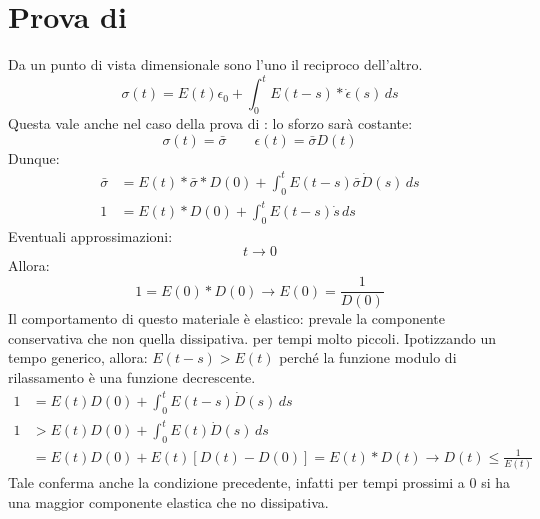 \section{Prova di }
Da un punto di vista dimensionale sono l'uno il reciproco dell'altro.
\begin{equation}
\sigma(t) = E(t)\epsilon_0 + \int_0^t{E(t-s)*\dot{\epsilon}(s)\,ds}
\end{equation}
Questa vale anche nel caso della prova di : lo sforzo sarà costante:
\begin{equation}
\sigma(t) = \bar{\sigma} \qquad \epsilon(t) = \bar{\sigma} D(t)
\end{equation}
Dunque:
\begin{equation}
\begin{split}
\bar{\sigma} &= E(t) * \bar{\sigma} * D(0) + \int_0^t{E(t-s)\bar{\sigma}\dot{D}(s)\,ds}\\
1 &= E(t) * D(0) + \int_0^t{E(t-s)\dot{s}\,ds}
\end{split}
\end{equation}
Eventuali approssimazioni:
\begin{equation}
t \rightarrow 0
\end{equation}
Allora:
\begin{equation}
1 = E(0) * D(0) \rightarrow E(0) = \frac{1}{D(0)}
\end{equation}
Il comportamento di questo materiale è elastico: prevale la componente conservativa che non quella dissipativa. per tempi molto piccoli.
Ipotizzando un tempo generico, allora: $E(t-s) > E(t)$ perché la funzione modulo di rilassamento è una funzione decrescente.
\begin{equation}
\begin{split}
1 &= E(t)D(0) + \int_0^t{E(t-s)\dot{D}(s)\,ds}\\
1 &> E(t)D(0) + \int_0^t{E(t)\dot{D}(s)\,ds}\\
&= E(t)D(0) + E(t)[D(t)-D(0)] = E(t) * D(t) \rightarrow D(t) \leq \frac{1}{E(t)}
\end{split}
\end{equation}
Tale conferma anche la condizione precedente, infatti per tempi prossimi a 0 si ha una maggior componente elastica che no dissipativa.

